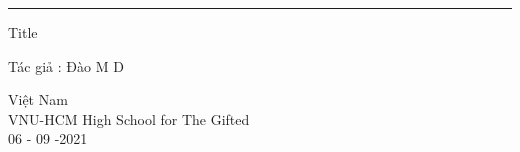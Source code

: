 \documentclass[12pt,a4paper]{article}
\begin{document}
\begin{titlepage}

\vspace*{1cm}
\hrule            
\vspace{0.5cm}
\Large{Title}
\large
{
\vspace{1.5cm}
\vfill
Tác giả : Đào M D
\vspace{0.8cm}

Việt Nam\\
VNU-HCM High School for The Gifted\\
06 - 09 -2021
}            
\end{titlepage}

\newpage
\end{document}
